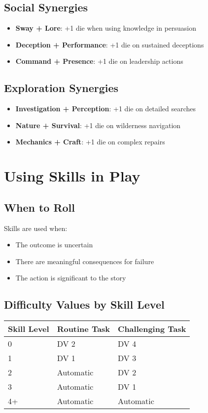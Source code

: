 \subsection*{Social Synergies}
\begin{itemize}
\item \textbf{Sway + Lore}: +1 die when using knowledge in persuasion
\item \textbf{Deception + Performance}: +1 die on sustained deceptions
\item \textbf{Command + Presence}: +1 die on leadership actions
\end{itemize}

\subsection*{Exploration Synergies}
\begin{itemize}
\item \textbf{Investigation + Perception}: +1 die on detailed searches
\item \textbf{Nature + Survival}: +1 die on wilderness navigation
\item \textbf{Mechanics + Craft}: +1 die on complex repairs
\end{itemize}

\section{Using Skills in Play}

\subsection*{When to Roll}
Skills are used when:
\begin{itemize}
\item The outcome is uncertain
\item There are meaningful consequences for failure
\item The action is significant to the story
\end{itemize}

\subsection*{Difficulty Values by Skill Level}
\begin{center}
\small
\begin{tabular}{lll}
\toprule
\textbf{Skill Level} & \textbf{Routine Task} & \textbf{Challenging Task} \\
\midrule
0 & DV 2 & DV 4 \\
1 & DV 1 & DV 3 \\
2 & Automatic & DV 2 \\
3 & Automatic & DV 1 \\
4+ & Automatic & Automatic \\
\bottomrule
\end{tabular}
\end{center}

